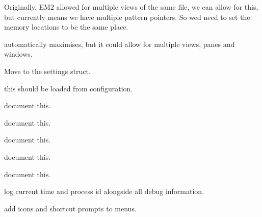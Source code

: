 \begin{DoxyRefList}
\label{todo__todo000082}%
%
Originally, EM2 allowed for multiple views of the same file, we can allow for this, but currently means we have multiple pattern pointers. So we\textquotesingle{}d need to set the memory locations to be the same place.

\label{todo__todo000084}%
%
automatically maximises, but it could allow for multiple views, panes and windows.  
\item[Member \mbox{\hyperlink{imgui__main_8c_a3e6926ae65525832ed3c1ba9d8df636e}{just\+\_\+opened}} ]\label{todo__todo000005}%
%
Move to the settings struct.  
\item[Member \mbox{\hyperlink{imgui__main_8c_a39311d663f15b821995a09b0e642ba0a}{languages}} \mbox{[}20\mbox{]}]\label{todo__todo000085}%
%
this should be loaded from configuration.  
\item[Member \mbox{\hyperlink{imgui__main_8c_a7bbc6b2446f13572a0053772b874a71d}{layer\+\_\+manager}} (\mbox{\hyperlink{class_view}{View}} $\ast$view)]\label{todo__todo000033}%
%
document this.  
\item[Member \mbox{\hyperlink{imgui__main_8c_ad6e8773f513b582fc2b4bd9326bfbb81}{layer\+Manager}} (void)]\label{todo__todo000172}%
%
document this.  
\item[Member \mbox{\hyperlink{imgui__main_8c_acb0fe553e99e0c67e13993e307f56167}{layer\+Previous}} (void)]\label{todo__todo000173}%
%
document this.  
\item[Member \mbox{\hyperlink{imgui__main_8c_a203608629391f45d4a64b1b48c3daa3b}{line\+\_\+action}} (void)]\label{todo__todo000146}%
%
document this.  
\item[Member \mbox{\hyperlink{imgui__main_8c_af9ff1d7e362a83f5ed3c1975ad7d6970}{load\+\_\+formats}} (void)]\label{todo__todo000204}%
%
document this.  
\item[Member \mbox{\hyperlink{imgui__main_8c_ab32b7623b4a8feb9ddb21f061a97217a}{log\+\_\+debug}} (const char $\ast$msg)]\label{todo__todo000077}%
%
log current time and process id alongside all debug information.  
\item[Member \mbox{\hyperlink{imgui__main_8c_a0ddf1224851353fc92bfbff6f499fa97}{main}} (int argc, char $\ast$argv\mbox{[}\mbox{]})]\label{todo__todo000007}%
%
add icons and shortcut prompts to menus. 


\end{DoxyRefList}
